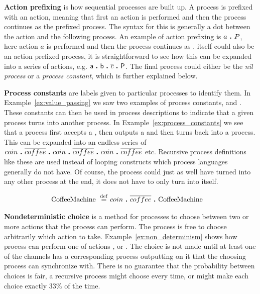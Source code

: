 	\textbf{Action prefixing} is how sequential processes are built up. A 
	process is prefixed with an action, meaning that first an action is 
	performed and then the process continues as the prefixed process. The syntax
	for this is generally a dot between the action and the following process. An 
	example of action prefixing is $a \ \textbf{.}\  P$, here action $a$ is performed
	and then the process continues as .  itself could also be an
	action prefixed process, it is straightforward to see how this can be
	expanded into a series of actions, e.g. 
	$\textsf{a} \ \textbf{.}\  \textsf{b} \ \textbf{.}\  \overline{c} \ \textbf{.}\  \textsf{P}$. The 
	final process  could either be the \textit{nil process} or a
	\textit{process constant}, which is further explained below.

	\textbf{Process constants} are labels given to particular processes to 
	identify them. In Example~\ref{ex:value_passing} we saw two examples of 
	process constants,  and . These constants can 
	then be used in process descriptions to indicate that a given process turns 
	into another process. In Example~\ref{ex:process_constants} we see that a 
	 process first accepts a , then outputs a 
	 and then turns back into a  process. 
	This can be expanded into an endless series of 
	$coin \ \textbf{.}\  \overline{coffee} \ \textbf{.}\  coin \ \textbf{.}\  \overline{coffee} \ \textbf{.}\  coin \ \textbf{.}\  \overline{coffee}$ 
	etc. Recursive process definitions like these are used instead of looping 
	constructs which process languages generally do not have.  Of course, the 
	 process could just as well have turned into any other 
	process at the end, it does not have to only turn into itself.
	
	\begin{Exa}\label{ex:process_constants}
	\begin{align*}
			\mathrm{CoffeeMachine} \ \stackrel{\mathrm{def}}{=}\  & coin \ \textbf{.}\  \overline{coffee} \ \textbf{.}\  \mathrm{CoffeeMachine} 
	\end{align*}	
	\end{Exa}

	\textbf{Nondeterministic choice} is a method for processes to choose between 
	two or more actions that the process can perform. The process is free to 
	choose arbitrarily which action to take. Example~\ref{ex:non_determinism} 
	shows how process  can perform one of actions , 
	 or . The choice is not made until at least one of the 
	channels has a corresponding process outputting on it that the choosing 
	process can synchronize with. There is no guarantee that the probability 
	between choices is fair, a recursive process might choose  every
	time, or might make each choice exactly 33\% of the time.
		
